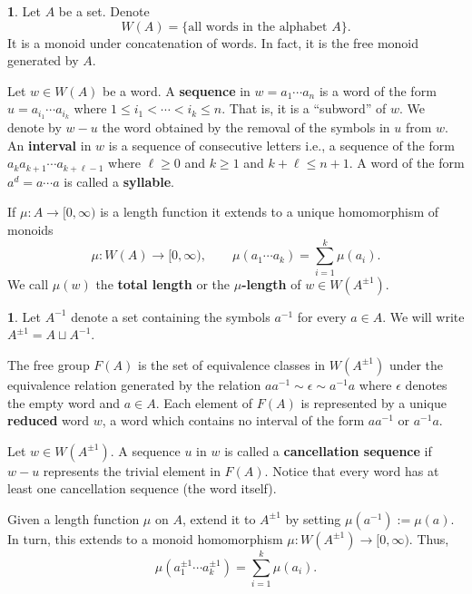 \documentclass[12pt]{amsart}
\theoremstyle{definition}
\newtheorem{void}[prop]{}
\def\Free{F}
\begin{document}
\begin{void}\label{par:length W(A)}
Let $A$ be a set.
Denote 
\[
W(A) =\{ \text{all words in the alphabet $A$}\}.
\]
It is a monoid under concatenation of words.
In fact, it is the free monoid generated by $A$.



Let $w \in W(A)$ be a word.
A {\bf sequence} in $w=a_1 \cdots a_n$ is a word of the form $u=a_{i_1} \cdots a_{i_k}$ where $1 \leq i_1 < \cdots < i_k \leq n$.
That is, it is a ``subword'' of $w$.
We denote by $w-u$ the word obtained by the removal of the symbols in $u$ from $w$.
An {\bf interval} in $w$ is a sequence of consecutive letters i.e., a sequence of the form $a_{k}a_{k+1} \cdots a_{k+\ell-1}$ where $\ell \geq 0$ and $k \geq 1$ and $k+\ell\leq n+1$.
A word of the form $a^d = a \cdots a$ is called a {\bf syllable}.

If $\mu \colon A \to [0,\infty)$ is a length function it extends to a unique homomorphism of monoids 
\[
\mu \colon W(A) \to [0,\infty), \qquad \mu(a_1 \cdots a_k) = \sum_{i=1}^k \mu(a_i).
\]
We call $\mu(w)$ the {\bf total length} or the {\bf $\mu$-length} of $w \in W(A^{\pm 1})$. 
\end{void}



\begin{void}\label{par:W(pm1) and Free(A)}
Let $A^{-1}$ denote a set containing the symbols $a^{-1}$ for every $a \in A$.
We will write $A^{\pm 1}= A \sqcup A^{-1}$.

The free group $\Free(A)$ is the set of equivalence classes in $W(A^{\pm 1})$ under the equivalence relation generated by the relation $aa^{-1} \sim \epsilon \sim a^{-1}a$ where $\epsilon$ denotes the empty word and $a \in A$.
Each element of $\Free(A)$ is represented by a unique {\bf reduced} word $w$, a word which contains no interval of the form $aa^{-1}$ or $a^{-1}a$.

Let $w \in W(A^{\pm 1})$.
A sequence $u$ in $w$ is called a {\bf cancellation sequence} if $w - u$ represents the trivial element in $\Free(A)$.
Notice that every word has at least one cancellation sequence (the word itself).

Given a length function $\mu$ on $A$, extend it to $A^{\pm 1}$ by setting $\mu(a^{-1}):=\mu(a)$.
In turn, this extends to a monoid homomorphism $\mu \colon W(A^{\pm 1}) \to [0,\infty)$.
Thus, 
\[
\mu(a_1^{\pm 1} \cdots a_k^{\pm 1}) = \sum_{i=1}^k \mu(a_i).
\]
\end{void}
\end{document}
